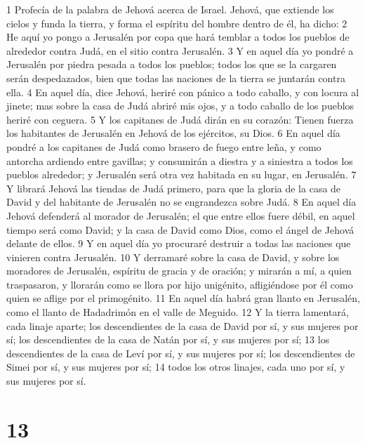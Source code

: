 1 Profecía de la palabra de Jehová acerca de Israel. Jehová, que extiende los cielos y funda la tierra, y forma el espíritu del hombre dentro de él, ha dicho:
2 He aquí yo pongo a Jerusalén por copa que hará temblar a todos los pueblos de alrededor contra Judá, en el sitio contra Jerusalén.
3 Y en aquel día yo pondré a Jerusalén por piedra pesada a todos los pueblos; todos los que se la cargaren serán despedazados, bien que todas las naciones de la tierra se juntarán contra ella.
4 En aquel día, dice Jehová, heriré con pánico a todo caballo, y con locura al jinete; mas sobre la casa de Judá abriré mis ojos, y a todo caballo de los pueblos heriré con ceguera.
5 Y los capitanes de Judá dirán en su corazón: Tienen fuerza los habitantes de Jerusalén en Jehová de los ejércitos, su Dios.
6 En aquel día pondré a los capitanes de Judá como brasero de fuego entre leña, y como antorcha ardiendo entre gavillas; y consumirán a diestra y a siniestra a todos los pueblos alrededor; y Jerusalén será otra vez habitada en su lugar, en Jerusalén.
7 Y librará Jehová las tiendas de Judá primero, para que la gloria de la casa de David y del habitante de Jerusalén no se engrandezca sobre Judá.
8 En aquel día Jehová defenderá al morador de Jerusalén; el que entre ellos fuere débil, en aquel tiempo será como David; y la casa de David como Dios, como el ángel de Jehová delante de ellos.
9 Y en aquel día yo procuraré destruir a todas las naciones que vinieren contra Jerusalén.
10 Y derramaré sobre la casa de David, y sobre los moradores de Jerusalén, espíritu de gracia y de oración; y mirarán a mí, a quien traspasaron, y llorarán como se llora por hijo unigénito, afligiéndose por él como quien se aflige por el primogénito.
11 En aquel día habrá gran llanto en Jerusalén, como el llanto de Hadadrimón en el valle de Meguido.
12 Y la tierra lamentará, cada linaje aparte; los descendientes de la casa de David por sí, y sus mujeres por sí; los descendientes de la casa de Natán por sí, y sus mujeres por sí;
13 los descendientes de la casa de Leví por sí, y sus mujeres por sí; los descendientes de Simei por sí, y sus mujeres por sí;
14 todos los otros linajes, cada uno por sí, y sus mujeres por sí.

\chapter{13}


